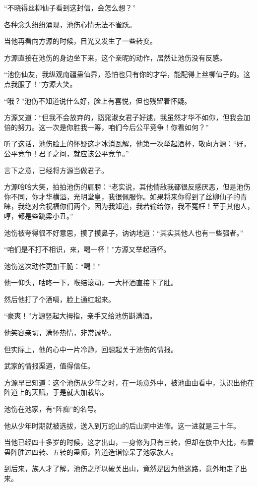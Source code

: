 \begin{this_body}
“不晓得丝柳仙子看到这封信，会怎么想？”

各种念头纷纷涌现，池伤心情无法不雀跃。

当他再看向方源的时候，目光又发生了一些转变。

方源直接在池伤的身边坐下来，这个亲昵的动作，居然让池伤没有反感。

“池伤仙友，我纵观南疆蛊仙界，恐怕也只有你的才华，能配得上丝柳仙子的。这点我服了！”方源大笑。

“哦？”池伤不知道说什么好，脸上有喜悦，但也残留着怀疑。

方源又道：“但我不会放弃的，窈窕淑女君子好逑，我虽然才华不如你，但我会加倍的努力。这一次是你胜我一筹，咱们今后公平竞争！你看如何？”

听了这话，池伤脸上的怀疑这才冰消瓦解，他第一次举起酒杯，敬向方源：“好，公平竞争！君子之间，就应该公平竞争。”

言下之意，已经将方源当做君子。

方源哈哈大笑，拍拍池伤的肩膀：“老实说，其他情敌我都很反感厌恶，但是池伤你不同，你才华横溢，光明堂皇，我很佩服你。如果将来你得到了丝柳仙子的青睐，我绝对会祝福你们两个，因为我知道，我若输给你，我不冤枉！至于其他人，哼，都是些跳梁小丑。”

池伤被夸得很不好意思，摸了摸鼻子，讷讷地道：“其实其他人也有一些强者。”

“咱们是不打不相识，来，喝一杯！”方源又举起酒杯。

池伤这次动作更加干脆：“喝！”

他一仰头，咕咚一下，喉结滚动，一大杯酒直接下了肚。

然后他打了个酒嗝，脸上通红起来。

“豪爽！”方源竖起大拇指，亲手又给池伤斟满酒。

他笑容亲切，满怀热情，非常诚挚。

但实际上，他的心中一片冷静，回想起关于池伤的情报。

武家的情报渠道，值得信任。

方源早已知道：这个池伤从少年之时，在一场意外中，被池曲由看中，认识出他在阵道上的天赋，于是就大加栽培。

池伤在池家，有“阵痴”的名号。

他从少年时期就被选拔，送入到万蛇山的后山洞中进修。这一进就是三十年。

当他已经四十多岁的时候，这才出山，一身修为只有三转，但却在族中大比，布置蛊阵胜过四转、五转的蛊师，阵道造诣惊呆了池家族人。

到后来，族人才了解，池伤之所以破关出山，竟然是因为他迷路，意外地走了出来。


\end{this_body}
